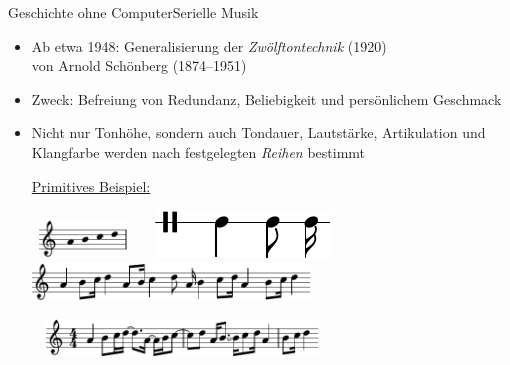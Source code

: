 \begin{frame}{Geschichte ohne Computer}{Serielle Musik}
	\begin{itemize}
		\item Ab etwa 1948: Generalisierung der \emph{Zwölftontechnik} (1920)\\
		\hfill {\footnotesize von Arnold Schönberg (1874--1951)}
		\item Zweck: Befreiung von Redundanz, Beliebigkeit und persönlichem Geschmack
		\item Nicht nur Tonhöhe, sondern auch Tondauer, Lautstärke, Artikulation und Klangfarbe werden nach festgelegten \emph{Reihen} bestimmt
		
		\bigskip
		\underline{Primitives Beispiel:}\\
		\medskip
		
		\mbox{
			\hspace{-1cm}
			\includegraphics[height=1cm]{lily/SerielleMusik_pitches.pdf}
			~\raisebox{.3cm}{$\Large\boldsymbol{*}$}
			~\includegraphics[height=.6cm]{lily/SerielleMusik_rhythms.pdf}
			~\raisebox{.3cm}{$\Large\boldsymbol{=}$}
			~\includegraphics[height=1cm]{lily/SerielleMusik_folded_nobars.pdf}
		}
	
		\bigskip
		\hfill {}
		~~\includegraphics[height=1cm]{lily/SerielleMusik_folded.pdf}
	\end{itemize}

\end{frame}

